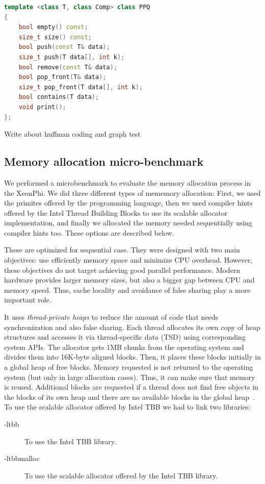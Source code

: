 \begin{lstlisting}[language=C++,basicstyle=\tt\footnotesize,captionpos=b,caption=PPQ interface,morekeywords={*, size_t}]
template <class T, class Comp> class PPQ
{
	bool empty() const;
	size_t size() const;
	bool push(const T& data);
	size_t push(T data[], int k);
	bool remove(const T& data);
	bool pop_front(T& data);
	size_t pop_front(T data[], int k);
	bool contains(T data);
	void print();
};
\end{lstlisting}

Write about huffman coding and graph test

\subsection{Memory allocation micro-benchmark}
We performed a microbenchmark to evaluate the memory allocation process in the XeonPhi. We did three different types of mememory allocation: First, we used the primites offered by the programming language, then we used compiler hints offered by the Intel Thread Building Blocks to use its scalable allocator implementation, and finally we allocated the memory needed sequentially using compiler hints too. These options are described below.

These are optimized for sequential case. They were designed with two main objectives: use efficiently memory space and minimize CPU overhead. However, these objectives do not target achieving good parallel performance. Modern hardware provides larger memory sizes, but also a bigger gap between CPU and memory speed. Thus, cache locality and avoidance of false sharing play a more important role.

It uses \textit{thread-private heaps} to reduce the amount of code that needs synchronization and also false sharing. Each thread allocates its own copy of heap structures and accesses it via thread-specific data (TSD) using corresponding system APIs.
The allocator gets 1MB chunks from the operating system and divides them into 16K-byte aligned blocks. Then, it places these blocks initially in a global heap of free blocks. Memory requested is not returned to the operating system (but only in large allocation cases). Thus, it can make sure that memory is reused. Additional blocks are requested if a thread does not find free objects in the blocks of its own heap and there are no available blocks in the global heap~\cite{_thefoundations,Hudson:2006:MST:1133956.1133967}.
To use the scalable allocator offered by Intel TBB we had to link two libraries:
\begin{description}
	\item[-ltbb] To use the Intel TBB library.
	\item[-ltbbmalloc] To use the scalable allocator offered by the Intel TBB library.
\end{description}
 

